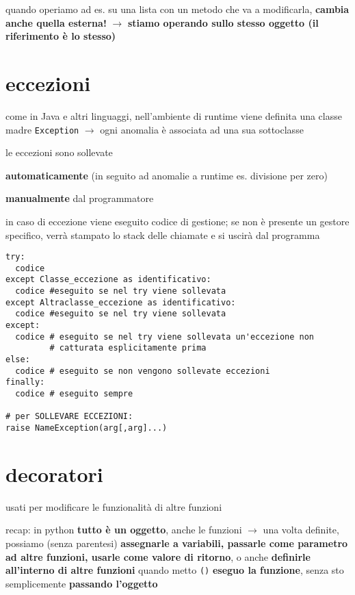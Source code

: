 quando operiamo ad es. su una lista con un metodo che va a modificarla, \textbf{cambia anche quella esterna!} $\rightarrow$ \textbf{stiamo operando sullo stesso oggetto (il riferimento \`e lo stesso)}

\section{eccezioni}

come in Java e altri linguaggi, nell'ambiente di runtime viene definita una classe madre \texttt{Exception} $\rightarrow$ ogni anomalia \`e associata ad una sua sottoclasse

le eccezioni sono sollevate

\textbf{automaticamente} (in seguito ad anomalie a runtime es. divisione per zero)

\textbf{manualmente} dal programmatore

in caso di eccezione viene eseguito codice di gestione; se non \`e presente un gestore specifico, verr\`a stampato lo stack delle chiamate e si uscir\`a dal programma

\begin{verbatim}
try:
  codice
except Classe_eccezione as identificativo:
  codice #eseguito se nel try viene sollevata
except Altraclasse_eccezione as identificativo:
  codice #eseguito se nel try viene sollevata
except:
  codice # eseguito se nel try viene sollevata un'eccezione non
  		 # catturata esplicitamente prima
else:
  codice # eseguito se non vengono sollevate eccezioni
finally:
  codice # eseguito sempre

# per SOLLEVARE ECCEZIONI:
raise NameException(arg[,arg]...)
\end{verbatim}

\section{decoratori}

usati per modificare le funzionalit\`a di altre funzioni

recap: in python \textbf{tutto \`e un oggetto}, anche le funzioni $\rightarrow$ una volta definite, possiamo (senza parentesi) \textbf{assegnarle a variabili, passarle come parametro ad altre funzioni, usarle come valore di ritorno}, o anche \textbf{definirle all'interno di altre funzioni}
quando metto \texttt{()}  \textbf{eseguo la funzione}, senza sto semplicemente \textbf{passando l'oggetto}

